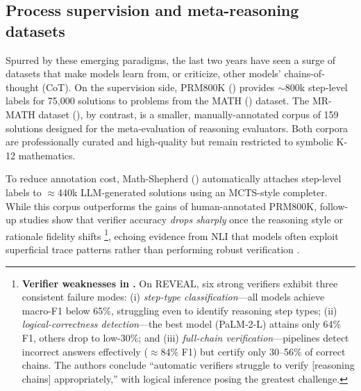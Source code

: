 \documentclass{article}
\begin{document}
\subsection{Process supervision and meta-reasoning datasets}
\label{subsec:process-supervision}
Spurred by these emerging paradigms, the last two years have seen a surge of datasets that make models learn from, or criticize, other models’ chains-of-thought (CoT).  On the supervision side, PRM800K (\citeyear{PRM800K_paper}) provides $\sim$800k step-level labels for 75,000 solutions to problems from the MATH (\citeyear{MATH}) dataset. The MR-MATH dataset (\citeyear{mrmath}), by contrast, is a smaller, manually-annotated corpus of 159 solutions designed for the meta-evaluation of reasoning evaluators. Both corpora are professionally curated and high-quality but remain restricted to symbolic K-12 mathematics.

To reduce annotation cost, Math-Shepherd (\citeyear{mathshepherd}) automatically attaches step-level labels to $\approx$440k LLM-generated solutions using an MCTS-style completer.  While this corpus outperforms the gains of human-annotated PRM800K, follow-up studies show that verifier accuracy  \emph{drops sharply} once the reasoning style or rationale fidelity shifts \citep{zhou2024CanLanguageModels, jacovi2024ACoT}\footnote{\textbf{Verifier weaknesses in \citet{jacovi2024ACoT}.} On REVEAL, six strong verifiers exhibit three consistent failure modes: (i) \emph{step-type classification}—all models achieve macro-F1 below 65\%, struggling even to identify reasoning step types; (ii) \emph{logical-correctness detection}—the best model (PaLM-2-L) attains only 64\% F1, others drop to low-30\%; and (iii) \emph{full-chain verification}—pipelines detect incorrect answers effectively ($\approx$84\% F1) but certify only 30–56\% of correct chains. The authors conclude ``automatic verifiers struggle to verify [reasoning chains] appropriately,'' with logical inference posing the greatest challenge.}, echoing evidence from NLI that models often exploit superficial trace patterns rather than performing robust verification \citep{mccoy2019right, gururangan2018annotation}.
\end{document}
